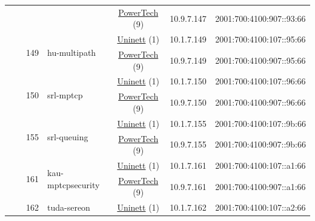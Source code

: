 \begin{small}
\begin{center}
\begin{longtable}{|c|c|c|c|c|c|c|c|}
  &  &  &  & \multicolumn{2}{|c|}{\tiny{\href{http://www.powertech.no}{PowerTech} (9)}} & \tiny{10.9.7.147} & \tiny{2001:700:4100:907::93:66} \\* \cline{3-3}\cline{4-4}\cline{5-5}\cline{6-6}\cline{7-7}\cline{8-8}
  &  & \multirow{2}{*}{\tiny{149}} & \multicolumn{1}{|l|}{\multirow{2}{*}{\tiny{hu-multipath}}} & \multicolumn{2}{|c|}{\tiny{\href{https://www.uninett.no}{Uninett} (1)}} & \tiny{10.1.7.149} & \tiny{2001:700:4100:107::95:66} \\* \cline{5-5}\cline{6-6}\cline{7-7}\cline{8-8}
  &  &  &  & \multicolumn{2}{|c|}{\tiny{\href{http://www.powertech.no}{PowerTech} (9)}} & \tiny{10.9.7.149} & \tiny{2001:700:4100:907::95:66} \\* \cline{3-3}\cline{4-4}\cline{5-5}\cline{6-6}\cline{7-7}\cline{8-8}
  &  & \multirow{2}{*}{\tiny{150}} & \multicolumn{1}{|l|}{\multirow{2}{*}{\tiny{srl-mptcp}}} & \multicolumn{2}{|c|}{\tiny{\href{https://www.uninett.no}{Uninett} (1)}} & \tiny{10.1.7.150} & \tiny{2001:700:4100:107::96:66} \\* \cline{5-5}\cline{6-6}\cline{7-7}\cline{8-8}
  &  &  &  & \multicolumn{2}{|c|}{\tiny{\href{http://www.powertech.no}{PowerTech} (9)}} & \tiny{10.9.7.150} & \tiny{2001:700:4100:907::96:66} \\* \cline{3-3}\cline{4-4}\cline{5-5}\cline{6-6}\cline{7-7}\cline{8-8}
  &  & \multirow{2}{*}{\tiny{155}} & \multicolumn{1}{|l|}{\multirow{2}{*}{\tiny{srl-queuing}}} & \multicolumn{2}{|c|}{\tiny{\href{https://www.uninett.no}{Uninett} (1)}} & \tiny{10.1.7.155} & \tiny{2001:700:4100:107::9b:66} \\* \cline{5-5}\cline{6-6}\cline{7-7}\cline{8-8}
  &  &  &  & \multicolumn{2}{|c|}{\tiny{\href{http://www.powertech.no}{PowerTech} (9)}} & \tiny{10.9.7.155} & \tiny{2001:700:4100:907::9b:66} \\* \cline{3-3}\cline{4-4}\cline{5-5}\cline{6-6}\cline{7-7}\cline{8-8}
  &  & \multirow{2}{*}{\tiny{161}} & \multicolumn{1}{|l|}{\multirow{2}{*}{\tiny{kau-mptcpsecurity}}} & \multicolumn{2}{|c|}{\tiny{\href{https://www.uninett.no}{Uninett} (1)}} & \tiny{10.1.7.161} & \tiny{2001:700:4100:107::a1:66} \\* \cline{5-5}\cline{6-6}\cline{7-7}\cline{8-8}
  &  &  &  & \multicolumn{2}{|c|}{\tiny{\href{http://www.powertech.no}{PowerTech} (9)}} & \tiny{10.9.7.161} & \tiny{2001:700:4100:907::a1:66} \\* \cline{3-3}\cline{4-4}\cline{5-5}\cline{6-6}\cline{7-7}\cline{8-8}
  &  & \multirow{2}{*}{\tiny{162}} & \multicolumn{1}{|l|}{\multirow{2}{*}{\tiny{tuda-sereon}}} & \multicolumn{2}{|c|}{\tiny{\href{https://www.uninett.no}{Uninett} (1)}} & \tiny{10.1.7.162} & \tiny{2001:700:4100:107::a2:66} \\* \cline{5-5}\cline{6-6}\cline{7-7}\cline{8-8}

\end{longtable}
\end{center}
\end{small}
